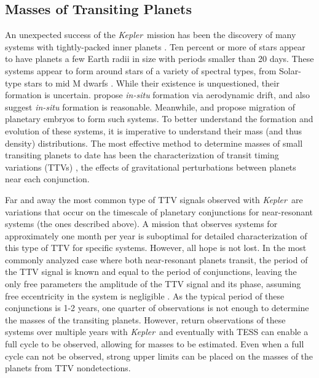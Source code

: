 \documentclass[12pt, preprint]{aastex}
\newcommand{\observatory}[1]{\textsl{#1}}
\newcommand{\kepler}{\observatory{Kepler}}
\newcommand{\Kepler}{\kepler}
\begin{document}
\subsection{Masses of Transiting Planets}
An unexpected success of the \Kepler\ mission has been the discovery of many 
 systems with tightly-packed inner planets 
 \citep[hereafter STIPs, e.g.][]{Boley13}. 
Ten percent or more of stars appear to have planets a few Earth radii in size
 with periods smaller than 20 days. 
These systems appear to form around stars of a variety of spectral types, from 
 Solar-type stars \citep[Kepler-11,][]{Lissauer11} to mid M dwarfs 
 \citep[Kepler-42,][]{KOI961}.
While their existence is unquestioned, their formation is uncertain. 
\cite{Boley13} propose \textit{in-situ} formation via aerodynamic drift, and 
 \cite{Chiang13} also suggest \textit{in-situ} formation is reasonable. 
Meanwhile, \cite{Swift13} and \cite{Cossou13} propose migration of 
 planetary embryos to form such systems.
To better understand the formation and evolution of these systems, it 
 is imperative to understand their mass (and thus density) distributions. 
The most effective method to determine masses of small transiting planets 
 to date has been the characterization of transit timing variations (TTVs) 
 \citep[e.g.][]{Fabrycky12}, the effects of gravitational perturbations
 between planets near each conjunction. 

Far and away the most common type of TTV signals observed with 
 \Kepler\ are variations that occur on the timescale of planetary conjunctions
 for near-resonant systems (the ones described above). 
A mission that observes systems for approximately one month per year is 
 suboptimal for detailed characterization of this type of TTV for specific 
 systems. 
However, all hope is not lost.
In the most commonly analyzed case where both near-resonant planets transit,
 the period of the TTV signal is known and equal to the period of conjunctions,
 leaving the only free parameters the amplitude of the TTV signal and its phase,
 assuming free eccentricity in the system is negligible \citep{Wu13}.
As the typical period of these conjunctions is 1-2 years, one quarter of
 observations is not enough to determine the masses of the transiting planets. 
However, return observations of these systems over multiple years with \Kepler\
 and eventually with TESS can enable a full cycle to be observed, allowing for 
 masses to be estimated. Even when a full cycle can not be observed, strong 
 upper limits can be placed on the masses of the planets from TTV nondetections.
\end{document}
